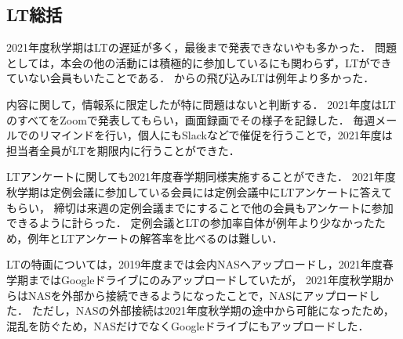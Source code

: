 \subsection*{LT総括}


2021年度秋学期はLTの遅延が多く，最後まで発表できない\firstGrade{}や\secondGrade{}も多かった．
問題としては，本会の他の活動には積極的に参加しているにも関わらず，LTができていない会員もいたことである．
\thirdGrade{}からの飛び込みLTは例年より多かった．

内容に関して，情報系に限定したが特に問題はないと判断する．
2021年度はLTのすべてをZoomで発表してもらい，画面録画でその様子を記録した．
毎週メールでのリマインドを行い，個人にもSlackなどで催促を行うことで，2021年度は担当者全員がLTを期限内に行うことができた．

LTアンケートに関しても2021年度春学期同様実施することができた．
2021年度秋学期は定例会議に参加している会員には定例会議中にLTアンケートに答えてもらい，
締切は来週の定例会議までにすることで他の会員もアンケートに参加できるように計らった．
定例会議とLTの参加率自体が例年より少なかったため，例年とLTアンケートの解答率を比べるのは難しい．

LTの特画については，2019年度までは会内NASへアップロードし，2021年度春学期まではGoogleドライブにのみアップロードしていたが，
2021年度秋学期からはNASを外部から接続できるようになったことで，NASにアップロードした．
ただし，NASの外部接続は2021年度秋学期の途中から可能になったため，混乱を防ぐため，NASだけでなくGoogleドライブにもアップロードした．
